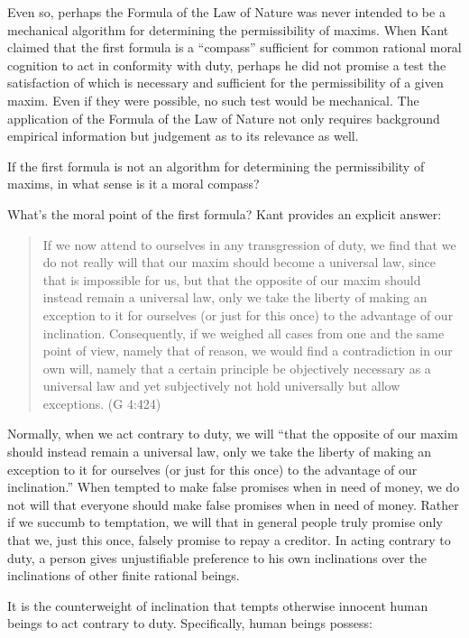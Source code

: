 Even so, perhaps the Formula of the Law of Nature was never intended to be a mechanical algorithm for determining the permissibility of maxims. When Kant claimed that the first formula is a ``compass'' sufficient for common rational moral cognition to act in conformity with duty, perhaps he did not promise a test the satisfaction of which is necessary and sufficient for the permissibility of a given maxim. Even if they were possible, no such test would be mechanical. The application of the Formula of the Law of Nature not only requires background empirical information but judgement as to its relevance as well.

If the first formula is not an algorithm for determining the permissibility of maxims, in what sense is it a moral compass?

What’s the moral point of the first formula? Kant provides an explicit answer:

\begin{quote}
	If we now attend to ourselves in any transgression of duty, we find that we do not really will that our maxim should become a universal law, since that is impossible for us, but that the opposite of our maxim should instead remain a universal law, only we take the liberty of making an exception to it for ourselves (or just for this once) to the advantage of our inclination. Consequently, if we weighed all cases from one and the same point of view, namely that of reason, we would find a contradiction in our own will, namely that a certain principle be objectively necessary as a universal law and yet subjectively not hold universally but allow exceptions. (G 4:424)
\end{quote}

Normally, when we act contrary to duty, we will “that the opposite of our maxim should instead remain a universal law, only we take the liberty of making an exception to it for ourselves (or just for this once) to the advantage of our inclination.” When tempted to make false promises when in need of money, we do not will that everyone should make false promises when in need of money. Rather if we succumb to temptation, we will that in general people truly promise only that we, just this once, falsely promise to repay a creditor. In acting contrary to duty, a person gives unjustifiable preference to his own inclinations over the inclinations of other finite rational beings.

It is the counterweight of inclination that tempts otherwise innocent human beings to act contrary to duty. Specifically, human beings possess:

